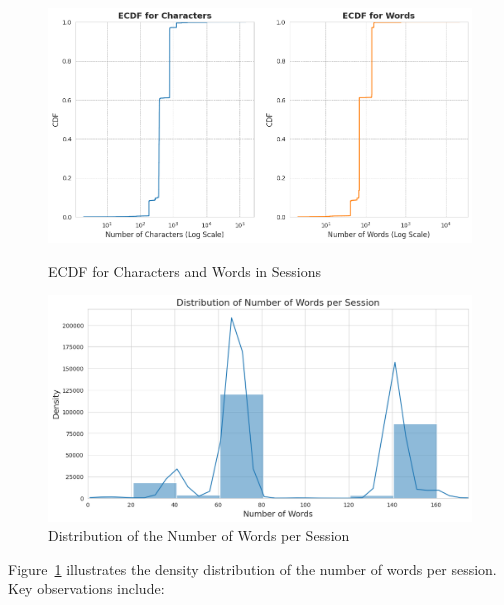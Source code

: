         \begin{figure}[h]
            \centering
            \begin{minipage}[c]{0.47\textwidth}
                \centering
                \includegraphics[width=\textwidth]{../figures/plots/section1/ecdf_for_characters_and_for_words.png}
                \caption{ECDF for Characters and Words in Sessions}
                \label{fig:ecdf_sessions}
            \end{minipage}
            \hfill
            \begin{minipage}[c]{0.47\textwidth}
                \centering
                \includegraphics[width=\textwidth]{../figures/plots/section1/distribution_of_number_of_words_per_session_limited.png}
                \caption{Distribution of the Number of Words per Session}
                \label{fig:word_distribution}
            \end{minipage}
        \end{figure}
        
        \vspace{-0.35cm}

        Figure~\ref{fig:word_distribution} illustrates the density distribution of the number of words per session. Key observations include:
        
